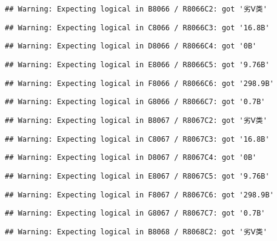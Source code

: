 \documentclass[
]{article}
\begin{document}
\begin{verbatim}
## Warning: Expecting logical in B8066 / R8066C2: got '劣Ⅴ类'
\end{verbatim}

\begin{verbatim}
## Warning: Expecting logical in C8066 / R8066C3: got '16.8B'
\end{verbatim}

\begin{verbatim}
## Warning: Expecting logical in D8066 / R8066C4: got '0B'
\end{verbatim}

\begin{verbatim}
## Warning: Expecting logical in E8066 / R8066C5: got '9.76B'
\end{verbatim}

\begin{verbatim}
## Warning: Expecting logical in F8066 / R8066C6: got '298.9B'
\end{verbatim}

\begin{verbatim}
## Warning: Expecting logical in G8066 / R8066C7: got '0.7B'
\end{verbatim}

\begin{verbatim}
## Warning: Expecting logical in B8067 / R8067C2: got '劣Ⅴ类'
\end{verbatim}

\begin{verbatim}
## Warning: Expecting logical in C8067 / R8067C3: got '16.8B'
\end{verbatim}

\begin{verbatim}
## Warning: Expecting logical in D8067 / R8067C4: got '0B'
\end{verbatim}

\begin{verbatim}
## Warning: Expecting logical in E8067 / R8067C5: got '9.76B'
\end{verbatim}

\begin{verbatim}
## Warning: Expecting logical in F8067 / R8067C6: got '298.9B'
\end{verbatim}

\begin{verbatim}
## Warning: Expecting logical in G8067 / R8067C7: got '0.7B'
\end{verbatim}

\begin{verbatim}
## Warning: Expecting logical in B8068 / R8068C2: got '劣Ⅴ类'
\end{verbatim}
\end{document}
